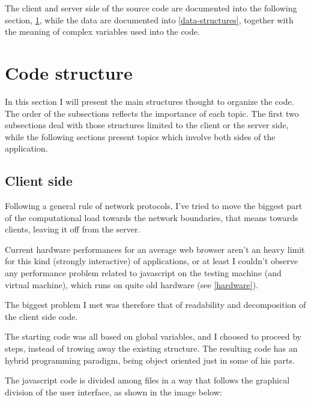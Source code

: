 \documentclass[10pt,a4paper,english]{book}
\begin{document}
The client and server side of the source code are documented into the
following section, \href{\#code-structure}{\ref*{code-structure}}, while the data are documented
into \href{\#data-structures}{\ref*{data-structures}}, together with the meaning of complex
variables used into the code.



\hypertarget{code-structure}{}
\chapter{Code structure}
\label{code-structure}

In this section I will present the main structures thought to organize
the code. The order of the subsections reflects the importance of each
topic. The first two subsections deal with those structures limited to
the client or the server side, while the following sections present
topics which involve both sides of the application.



\hypertarget{client-side}{}
\section{Client side}
\label{client-side}

Following a general rule of network protocols, I've tried to move the
biggest part of the computational load towards the network boundaries,
that means towards clients, leaving it off from the server.

Current hardware performances for an average web browser aren't an
heavy limit for this kind (strongly interactive) of applications, or
at least I couldn't observe any performance problem related to
javascript on the testing machine (and virtual machine), which runs on
quite old hardware (see \href{\#hardware}{\ref*{hardware}}).

The biggest problem I met was therefore that of readability and
decomposition of the client side code.

The starting code was all based on global variables, and I choosed to
proceed by steps, instead of trowing away the existing structure. The
resulting code has an hybrid programming paradigm, being object
oriented just in some of his parts\footnotemark[1].

The javascript code is divided among files in a way that follows the
graphical division of the user interface, as shown in the image below:
\end{document}
